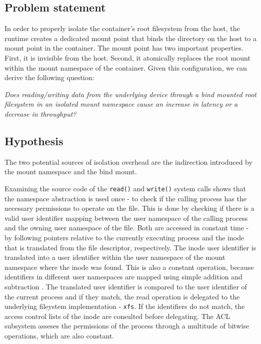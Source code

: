\subsection{Problem statement}

In order to properly isolate the container's root filesystem from the host, the runtime 
creates a dedicated mount point that binds the directory on the host to a mount point 
in the container. The mount point has two important properties. First, it is invisible from the host. 
Second, it atomically replaces the root mount within the mount namespace 
of the container. Given this configuration, we can derive the following question:

\textit{Does reading/writing data from the underlying device through a bind mounted root filesystem in 
an isolated mount namespace cause an increase in latency or a decrease in throughput?}

\subsection{Hypothesis}
The two potential sources of isolation overhead are the indirection introduced by the mount namespace 
and the bind mount. 

Examining the source code of the \verb|read()| and \verb|write()| system calls 
shows that the namespace abstraction is used once - to check if the calling process 
has the necessary permissions to operate on the file.
This is done by checking if there is a valid user identifier 
mapping between the user namespace of the calling process and the owning user namespace of the 
file. Both are accessed in constant time - by following pointers relative to the currently 
executing process and the inode that is translated from the file descriptor, respectively.
The inode user identifier is translated into a user identifier within the user namespace 
of the mount namespace where the inode was found.
This is also a constant operation, because identifiers in different user namespaces are mapped using simple 
addition and subtraction \cite{idmappings}.
The translated user identifier is compared
to the user identifier of the current process and if they match, the read operation 
is delegated to the underlying fileystem implementation - \verb|xfs|. If the identifiers do not match, 
the access control lists of the inode are consulted before delegating. 
The ACL subsystem asseses the permissions of the process through a multitude of bitwise operations, which 
are also constant. 

